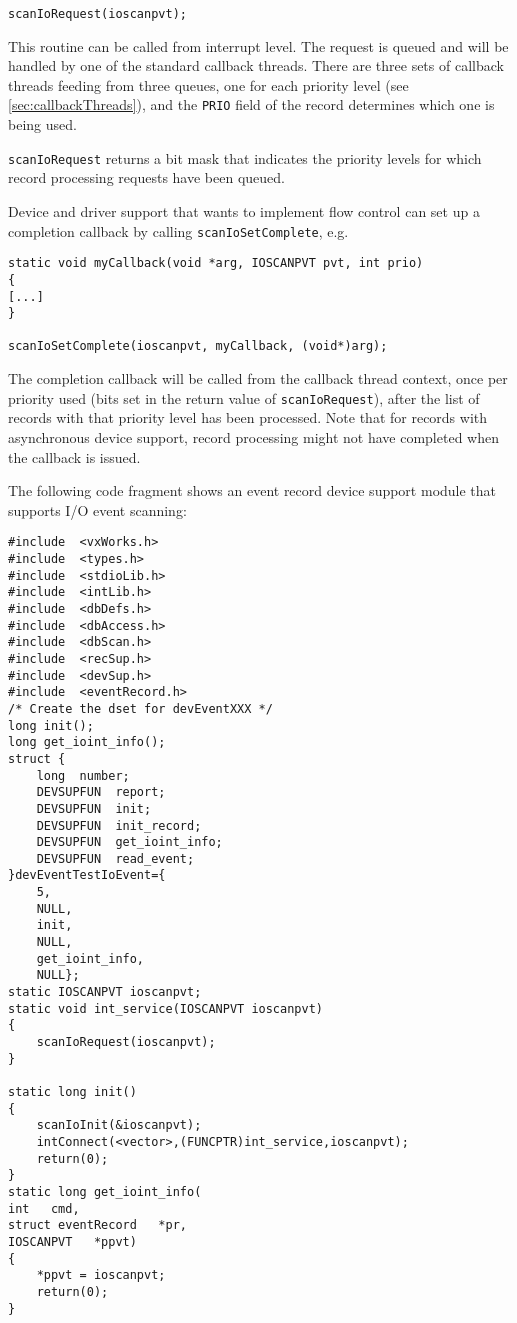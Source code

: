 \begin{enumerate}
\begin{verbatim}
scanIoRequest(ioscanpvt);
\end{verbatim}

This routine can be called from interrupt level. The request is queued and will be handled by one of the standard callback threads. There are three sets of callback threads feeding from three queues, one for each priority level (see \ref{sec:callbackThreads}), and the \verb|PRIO| field of the record determines which one is being used. 

\verb|scanIoRequest| returns a bit mask that indicates the priority levels for which record processing requests have been queued.

Device and driver support that wants to implement flow control can set up a completion callback by calling \verb|scanIoSetComplete|, e.g.

\begin{verbatim}
static void myCallback(void *arg, IOSCANPVT pvt, int prio)
{
[...]
}

scanIoSetComplete(ioscanpvt, myCallback, (void*)arg);
\end{verbatim}

The completion callback will be called from the callback thread context, once per priority used (bits set in the return value of \verb|scanIoRequest|), after the list of records with that priority level has been processed. Note that for records with asynchronous device support, record processing might not have completed when the callback is issued.
\end{enumerate}

The following code fragment shows an event record device support module that supports I/O event scanning: 

\begin{verbatim}
#include  <vxWorks.h>
#include  <types.h>
#include  <stdioLib.h>
#include  <intLib.h>
#include  <dbDefs.h>
#include  <dbAccess.h>
#include  <dbScan.h>
#include  <recSup.h>
#include  <devSup.h>
#include  <eventRecord.h>
/* Create the dset for devEventXXX */
long init();
long get_ioint_info();
struct {
    long  number;
    DEVSUPFUN  report;
    DEVSUPFUN  init;
    DEVSUPFUN  init_record;
    DEVSUPFUN  get_ioint_info;
    DEVSUPFUN  read_event;
}devEventTestIoEvent={
    5,
    NULL,
    init,
    NULL,
    get_ioint_info,
    NULL};
static IOSCANPVT ioscanpvt;
static void int_service(IOSCANPVT ioscanpvt)
{
    scanIoRequest(ioscanpvt);
}

static long init()
{
    scanIoInit(&ioscanpvt);
    intConnect(<vector>,(FUNCPTR)int_service,ioscanpvt);
    return(0);
}
static long get_ioint_info(
int   cmd,
struct eventRecord   *pr,
IOSCANPVT   *ppvt)
{
    *ppvt = ioscanpvt;
    return(0);
}
\end{verbatim}

